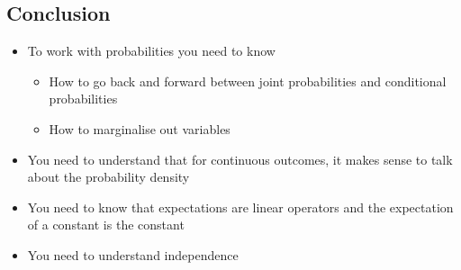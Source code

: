 
\begin{slide}
\section{Conclusion}
  
\begin{PauseHighLight}
  \begin{itemize}
  \item To work with probabilities you need to know
    \begin{itemize}
    \item How to go back and forward between joint
      probabilities and conditional probabilities
    \item How to marginalise out variables\pause
    \end{itemize}
  \item You need to understand that for continuous outcomes, it
    makes sense to talk about the probability density\pause
  \item You need to know that expectations are linear operators and
    the expectation of a constant is the constant\pause
  \item You need to understand independence\pause
  \end{itemize}
\end{PauseHighLight}

\end{slide}




